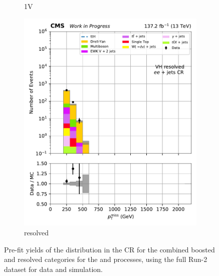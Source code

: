 \begin{figure}[htbp]
\begin{subfigure}[b]{0.24\textwidth}
        \caption{\VH 1V}
    \end{subfigure}
    \hfill
    \begin{subfigure}[b]{0.24\textwidth}
        \includegraphics[width=\textwidth]{figures/region_plots/2016to18/region_4/VH_resolved.pdf}
        \caption{\VH resolved}
    \end{subfigure}
    \caption[Pre-fit yields of the \ptmiss distribution in the \doubleEleCr control region for the combined boosted and resolved categories for the \ttH and \VH processes, using the full Run-2 dataset for data and simulation]{Pre-fit yields of the \ptmiss distribution in the \doubleEleCr \gls{CR} for the combined boosted and resolved categories for the \ttH and \VH processes, using the full Run-2 dataset for data and simulation.}
    \label{fig:htoinv_cr_yields_comb2016to18_double_electron}
\end{figure}

\clearpage

